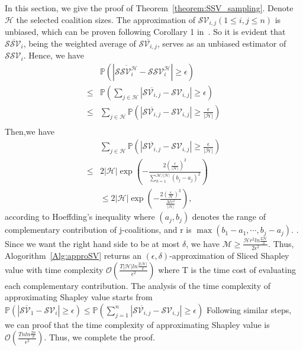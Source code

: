 In this section, we give the proof of Theorem~\ref{theorem:SSV_sampling}. Denote $\mathcal{H}$ the selected coalition sizes.
The approximation of $\mathcal{SV}_{i,j}(1\leq i,j\leq n)$ is unbiased, which can be proven following Corollary 1 in~\cite{sun2024shapley}. So it is evident that $\overline{\mathcal{SSV}_{i}}$, being the weighted average of $\overline{\mathcal{SV}_{i,j}}$, serves as an unbiased estimator of $\mathcal{SSV}_{i}$.
Hence, we have 
\begin{align*}
    &\mathbb{P}(|\overline{\mathcal{SSV}_i^{\mathcal{H}}}-\mathcal{SSV}_i^{\mathcal{H}}|\geq \epsilon)\\
    \leq & \mathbb{P}(\sum_{j\in \mathcal{H}}|\overline{\mathcal{SV}_{i,j}}-\mathcal{SV}_{i,j}|\geq \epsilon) \\
    \leq & \sum_{j\in \mathcal{H}} \mathbb{P}(|\overline{\mathcal{SV}_{i,j}}-\mathcal{SV}_{i,j}|\geq \frac{\epsilon}{\mathcal{|H|}}) \\
\end{align*}
Then,we have
\begin{align*}
    &\sum_{j\in \mathcal{H}} \mathbb{P}(|\overline{\mathcal{SV}_{i,j}}-\mathcal{SV}_{i,j}|\geq \frac{\epsilon}{\mathcal{|H|}})\\
    \leq & 2|\mathcal{H}|\exp(-\frac{2(\frac{\epsilon}{|\mathcal{H}|})^2}{\sum_{k=1}^{\mathcal{M}/|\mathcal{H}|} (b_j-a_j)^2}) \\
    & \leq 2|\mathcal{H}|\exp(-\frac{2(\frac{\epsilon}{\mathcal{H}})^2}{\frac{\mathcal{M}r^2}{|\mathcal{H}|}}),
\end{align*}
according to Hoeffding's inequality where $(a_j,b_j)$ denotes the range of complementary contribution of j-coalitions, and r is $\max(b_1-a_1,\cdots,b_j-a_j)$. . Since we want the right hand side to be at most $\delta$, we have $\mathcal{M} \geq \frac{\mathcal{H}r^2ln\frac{2\mathcal{H}}{\delta}}{2\epsilon^2}$. Thus, Alogorithm~\ref{Alg:approSV} returns an $(\epsilon,\delta)$-approximation of Sliced Shapley value with time complexity $\mathcal{O}( \frac{T|\mathcal{H}|ln\frac{2|\mathcal{H}|}{\delta}}{\epsilon^2})$ where T is the time cost of evaluating each complementary contribution.
    The analysis of the time complexity of approximating Shapley value starts from $\mathbb{P}(|\overline{\mathcal{SV}_1}-\mathcal{SV}_i|\geq \epsilon)
    \leq \mathbb{P}(\sum_{j=1}^n|\overline{\mathcal{SV}_{i,j}}-\mathcal{SV}_{i,j}|\geq \epsilon)$
    Following similar steps, we can proof that the time complexity of approximating Shapley value is $\mathcal{O}( \frac{Tnln\frac{2n}{\delta}}{\epsilon^2})$.  
Thus, we complete the proof.